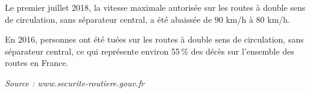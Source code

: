 \documentclass[10pt]{article}
\begin{document}
\setlength\parindent{0mm}
\pagestyle{fancy}
\thispagestyle{empty}
    
    
    




\medskip

Le premier juillet 2018, la vitesse maximale autorisée sur les routes à double sens de circulation, sans séparateur central, a été abaissée de $90$ km/h à $80$ km/h.

En 2016,  personnes ont été tuées sur les routes à double sens de circulation, sans séparateur central, ce qui représente environ 55\,\% des décès sur l'ensemble des routes en France.

\emph{Source : www.securite-routiere.gouv.fr}

\medskip
\end{document}
